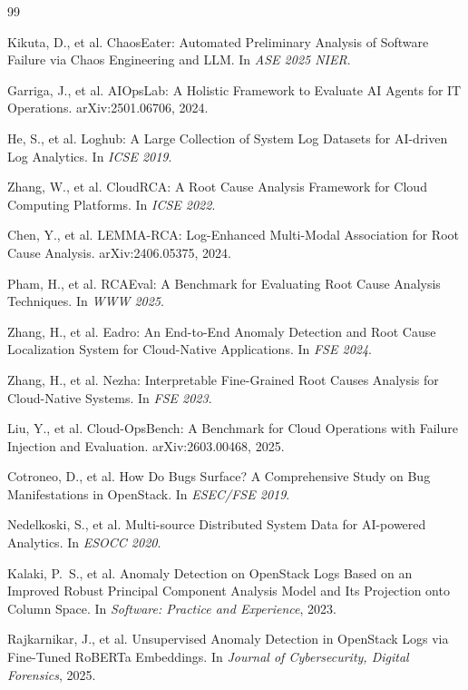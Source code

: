 \documentclass[sigconf,review]{acmart}
\begin{document}

\begin{thebibliography}{99}

Kikuta, D., et al.
ChaosEater: Automated Preliminary Analysis of Software Failure via Chaos Engineering and LLM.
In \textit{ASE 2025 NIER}.

Garriga, J., et al.
AIOpsLab: A Holistic Framework to Evaluate AI Agents for IT Operations.
arXiv:2501.06706, 2024.

He, S., et al.
Loghub: A Large Collection of System Log Datasets for AI-driven Log Analytics.
In \textit{ICSE 2019}.

Zhang, W., et al.
CloudRCA: A Root Cause Analysis Framework for Cloud Computing Platforms.
In \textit{ICSE 2022}.

Chen, Y., et al.
LEMMA-RCA: Log-Enhanced Multi-Modal Association for Root Cause Analysis.
arXiv:2406.05375, 2024.

Pham, H., et al.
RCAEval: A Benchmark for Evaluating Root Cause Analysis Techniques.
In \textit{WWW 2025}.

Zhang, H., et al.
Eadro: An End-to-End Anomaly Detection and Root Cause Localization System for Cloud-Native Applications.
In \textit{FSE 2024}.

Zhang, H., et al.
Nezha: Interpretable Fine-Grained Root Causes Analysis for Cloud-Native Systems.
In \textit{FSE 2023}.

Liu, Y., et al.
Cloud-OpsBench: A Benchmark for Cloud Operations with Failure Injection and Evaluation.
arXiv:2603.00468, 2025.

Cotroneo, D., et al.
How Do Bugs Surface? A Comprehensive Study on Bug Manifestations in OpenStack.
In \textit{ESEC/FSE 2019}.

Nedelkoski, S., et al.
Multi-source Distributed System Data for AI-powered Analytics.
In \textit{ESOCC 2020}.

Kalaki, P.~S., et al.
Anomaly Detection on OpenStack Logs Based on an Improved Robust Principal Component Analysis Model and Its Projection onto Column Space.
In \textit{Software: Practice and Experience}, 2023.

Rajkarnikar, J., et al.
Unsupervised Anomaly Detection in OpenStack Logs via Fine-Tuned RoBERTa Embeddings.
In \textit{Journal of Cybersecurity, Digital Forensics}, 2025.

\end{thebibliography}
\end{document}
